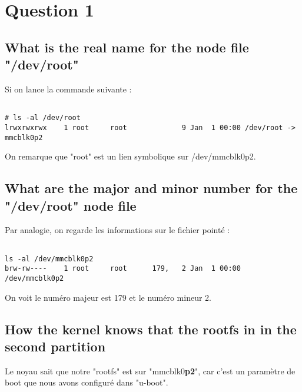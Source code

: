 
\chapter{Question 1} %

\label{Question 1} %


\section{What is the real name for the node file "/dev/root"}

Si on lance la commande suivante :
\begin{lstlisting}[frame=single,style=Console]  % Start your code-block

# ls -al /dev/root
lrwxrwxrwx    1 root     root             9 Jan  1 00:00 /dev/root -> mmcblk0p2
\end{lstlisting}

On remarque que "root" est un lien symbolique sur /dev/mmcblk0p2. 

\section{What are the major and minor number for the "/dev/root" node file}

Par analogie, on regarde les informations sur le fichier pointé :

\begin{lstlisting}[frame=single,style=Console]  % Start your code-block

ls -al /dev/mmcblk0p2 
brw-rw----    1 root     root      179,   2 Jan  1 00:00 /dev/mmcblk0p2
\end{lstlisting}

On voit le numéro majeur est 179 et le numéro mineur 2. 

\section{How the kernel knows that the rootfs in in the second partition}

Le noyau sait que notre "rootfs" est sur "mmcblk0\textbf{p2}", car c'est un paramètre de boot que nous avons configuré dans "u-boot".
